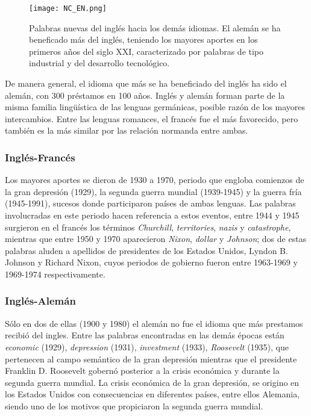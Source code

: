 \begin{figure} %
	\centering
	\texttt{[image: NC\_EN.png]}
	\label{fig.NC_EN}
	\caption{Palabras nuevas del inglés hacia los demás idiomas. El alemán se ha beneficado más del inglés, teniendo los mayores aportes en los primeros años del siglo XXI, caracterizado por palabras de tipo industrial y del desarrollo tecnológico.}
\end{figure} %

De manera general, el idioma que más se ha beneficiado del inglés ha sido el
alemán, con 300 préstamos en 100 años.  Inglés y alemán forman parte de la
misma familia lingüística de las lenguas germánicas,  posible razón de los
mayores intercambios. Entre las lenguas romances, el francés fue el más
favorecido, pero también es la más similar por las relación normanda entre
ambas.

\subsubsection*{Inglés-Francés} %

Los mayores aportes se dieron de 1930 a 1970, periodo que engloba comienzos de
la gran depresión (1929), la segunda guerra mundial (1939-1945) y la guerra fría (1945-1991), sucesos donde
participaron países de ambas lenguas. Las palabras involucradas en este periodo
hacen referencia a estos eventos, entre 1944 y 1945 surgieron en el francés los
términos \textit{Churchill}, \textit{territories}, \textit{nazis} y
\textit{catastrophe},  mientras que  entre 1950 y 1970
aparecieron \textit{Nixon}, \textit{dollar} y \textit{Johnson}; dos de estas
palabras aluden a apellidos de presidentes de los Estados Unidos,  Lyndon B.
Johnson y Richard Nixon, cuyos periodos de gobierno fueron  entre 1963-1969 y
1969-1974 respectivamente.
\subsubsection*{Inglés-Alemán} %
Sólo  en dos de ellas (1900  y 1980) el alemán no fue el idioma que más prestamos recibió  del ingles. Entre las palabras encontradas
en las demás épocas están \textit{economic} (1929), \textit{depression} (1931),
\textit{investment} (1933), \textit{Roosevelt} (1935), que pertenecen al campo
semántico de la gran depresión mientras que el presidente Franklin D. Roosevelt
gobernó posterior a la crisis económica y durante la segunda guerra mundial. La crisis económica de la gran depresión, se origino en los Estados Unidos con consecuencias en diferentes países, entre ellos  Alemania, siendo uno de los motivos que propiciaron la segunda guerra mundial.

